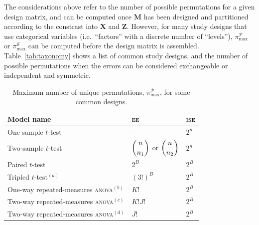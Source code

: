 The considerations above refer to the number of possible permutations for a given design matrix, and can be computed once $\mathbf{M}$ has been designed and partitioned according to the constrast into $\mathbf{X}$ and $\mathbf{Z}$. However, for many study designs that use categorical variables (i.e.\ ``factors'' with a discrete number of ``levels''), $\pi^{\mathcal{P}}_{\text{max}}$ or $\pi^{\mathcal{S}}_{\text{max}}$ can be computed before the design matrix is assembled. Table~\ref{tab:taxonomy} shows a list of common study designs, and the number of possible permutations when the errors can be considered exchangeable or independent and symmetric.

\begin{table}[p]
\caption{Maximum number of unique permutations, $\pi^{\mathcal{P}}_{\text{max}}$, for some common designs.}
\begin{center}
{\small
\begin{tabular}{@{}l@{}m{57mm}<{\centering}@{}m{10mm}<{\centering}@{}}
\toprule
Model name & \textsc{ee} & \textsc{ise}\\
\midrule
One sample $t$-test & \vspace*{3mm}--\vspace*{3mm} & $2^{n}$ \\
\midrule
Two-sample $t$-test & \vspace*{3mm}$\dbinom{n}{n_1}$ or $\dbinom{n}{n_2}$\vspace*{3mm} & $2^{n}$ \\
\midrule
Paired $t$-test & \vspace*{3mm}$2^{B}$\vspace*{3mm} & $2^{B}$ \\
\midrule
Tripled $t$-test$^{(a)}$ & \vspace*{3mm}$(3!)^{B}$\vspace*{3mm}  & $2^{B}$ \\
\midrule
One-way repeated-measures \textsc{anova}$^{(b)}$ & \vspace*{3mm}$K!$\vspace*{3mm} & $2^{B}$ \\
\midrule
Two-way repeated-measures \textsc{anova}$^{(c)}$ & \vspace*{3mm}$K!J!$\vspace*{3mm} & $2^{B}$ \\
\midrule
Two-way repeated-measures \textsc{anova}$^{(d)}$ & \vspace*{3mm}$J!$\vspace*{3mm} & $2^{B}$ \\

\end{tabular}}
\end{center}
\end{table}
